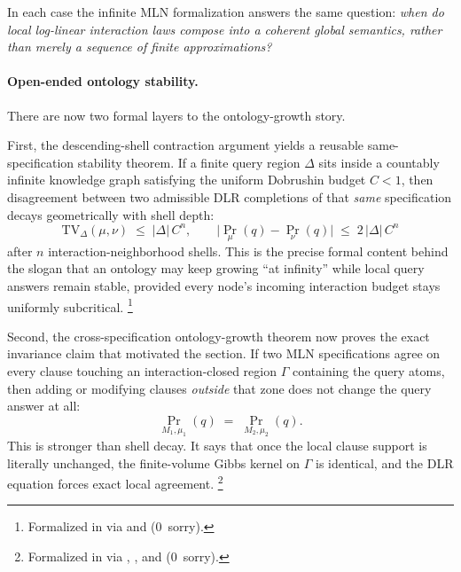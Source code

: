 \documentclass[11pt,openany]{report}
\begin{document}
\medskip
\noindent
In each case the infinite MLN formalization answers the same question:
\emph{when do local log-linear interaction laws compose into a coherent global
semantics, rather than merely a sequence of finite approximations?}

\paragraph{Open-ended ontology stability.}
There are now two formal layers to the ontology-growth story.

First, the descending-shell contraction argument yields a reusable
same-specification stability theorem.  If a finite query region $\Delta$ sits
inside a countably infinite knowledge graph satisfying the uniform Dobrushin
budget $C < 1$, then disagreement between two admissible DLR completions of
that \emph{same} specification decays geometrically with shell depth:
\[
  \mathrm{TV}_{\Delta}(\mu,\nu) \;\le\; |\Delta|\,C^n,
  \qquad
  \bigl|\Pr_{\mu}(q)-\Pr_{\nu}(q)\bigr|
  \;\le\; 2\,|\Delta|\,C^n
\]
after $n$ interaction-neighborhood shells.  This is the precise formal
content behind the slogan that an ontology may keep growing ``at infinity''
while local query answers remain stable, provided every node's incoming
interaction budget stays uniformly subcritical.%
\footnote{Formalized in
via
and
(0~sorry).}

\noindent
Second, the cross-specification ontology-growth theorem now proves the exact
invariance claim that motivated the section.  If two MLN specifications agree
on every clause touching an interaction-closed region $\Gamma$ containing the
query atoms, then adding or modifying clauses \emph{outside} that zone does
not change the query answer at all:
\[
  \Pr_{M_1,\mu_1}(q) \;=\; \Pr_{M_2,\mu_2}(q).
\]
This is stronger than shell decay.  It says that once the local clause support
is literally unchanged, the finite-volume Gibbs kernel on $\Gamma$ is
identical, and the DLR equation forces exact local agreement.%
\footnote{Formalized in
via
,
,
and
(0~sorry).}
\end{document}
